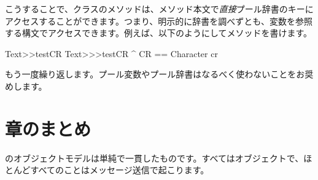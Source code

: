 \documentclass[a4paper,10pt,twoside]{book}
\begin{document}
こうすることで、クラスのメソッドは、メソッド本文で\emph{直接}プール辞書のキーにアクセスすることができます。つまり、明示的に辞書を調べずとも、変数を参照する構文でアクセスできます。例えば、以下のようにしてメソッドを書けます。
  
\begin{method}[texttestcr]{Text>>testCR}
Text>>>testCR 	
      ^ CR == Character cr
\end{method}

もう一度繰り返します。プール変数やプール辞書はなるべく使わないことをお奨めします。

\section{章のまとめ}

\pharo のオブジェクトモデルは単純で一貫したものです。すべてはオブジェクトで、ほとんどすべてのことはメッセージ送信で起こります。
\end{document}
